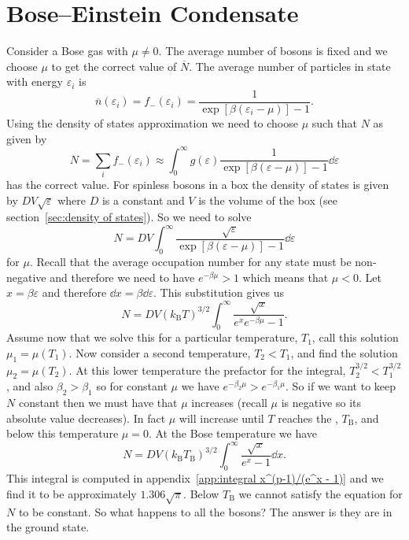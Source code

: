 \documentclass[a4paper]{article}
\newcommand{\boltzmann}{k_\mathrm{B}}
\newcommand{\mean}[1]{\overline{#1}}
\newcommand{\boseTemp}{T_{\mathrm{B}}}
\begin{document}
    \section{Bose--Einstein Condensate}
    Consider a Bose gas with \(\mu \ne 0\).
    The average number of bosons is fixed and we choose \(\mu\) to get the correct value of \(\mean{N}\).
    The average number of particles in state with energy \(\varepsilon_i\) is
    \[\mean{n}(\varepsilon_i) = f_{-}(\varepsilon_i) = \frac{1}{\exp[\beta(\varepsilon_i - \mu)] - 1}.\]
    Using the density of states approximation we need to choose \(\mu\) such that \(N\) as given by
    \[N = \sum_{i} f_{-}(\varepsilon_i) \approx \int_{0}^{\infty} g(\varepsilon) \frac{1}{\exp[\beta(\varepsilon - \mu)] - 1}\dd{\varepsilon}\]
    has the correct value.
    For spinless bosons in a box the density of states is given by \(DV\sqrt{\varepsilon}\) where \(D\) is a constant and \(V\) is the volume of the box (see section~\ref{sec:density of states}).
    So we need to solve
    \[N = DV \int_{0}^{\infty} \frac{\sqrt{\varepsilon}}{\exp[\beta(\varepsilon - \mu)] - 1}\dd{\varepsilon}\]
    for \(\mu\).
    Recall that the average occupation number for any state must be non-negative and therefore we need to have \(e^{-\beta\mu} > 1\) which means that \(\mu < 0\).
    Let \(x = \beta\varepsilon\) and therefore \(\dd{x} = \beta\dd{\varepsilon}\).
    This substitution gives us
    \[N = DV(\boltzmann T)^{3/2} \int_{0}^{\infty} \frac{\sqrt{x}}{e^xe^{-\beta\mu} - 1}.\]
    Assume now that we solve this for a particular temperature, \(T_1\), call this solution \(\mu_1 = \mu(T_1)\).
    Now consider a second temperature, \(T_2 < T_1\), and find the solution \(\mu_2 = \mu(T_2)\).
    At this lower temperature the prefactor for the integral, \(T_2^{3/2} < T_{1}^{3/2}\), and also \(\beta_2 > \beta_1\) so for constant \(\mu\) we have \(e^{-\beta_2 \mu} > e^{-\beta_1 \mu}\).
    So if we want to keep \(N\) constant then we must have that \(\mu\) increases (recall \(\mu\) is negative so its absolute value decreases).
    In fact \(\mu\) will increase until \(T\) reaches the , \(\boseTemp\), and below this temperature \(\mu = 0\).
    At the Bose temperature we have
    \[N = DV(\boltzmann \boseTemp)^{3/2} \int_{0}^{\infty} \frac{\sqrt{x}}{e^x - 1}\dd{x}.\]
    This integral is computed in appendix~\ref{app:integral x^(p-1)/(e^x - 1)} and we find it to be approximately \(1.306\sqrt{\pi}\).
    Below \(\boseTemp\) we cannot satisfy the equation for \(N\) to be constant.
    So what happens to all the bosons?
    The answer is they are in the ground state.
\end{document}
